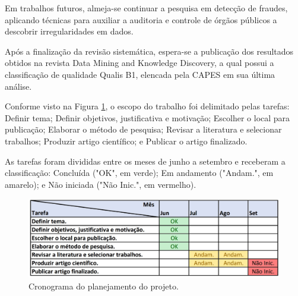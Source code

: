 \documentclass[smallextended]{svjour3}
\begin{document}
Em trabalhos futuros, almeja-se continuar a pesquisa em detecção de fraudes, aplicando técnicas para auxiliar a auditoria e controle de órgãos públicos a descobrir irregularidades em dados.

Após a finalização da revisão sistemática, espera-se a publicação dos resultados obtidos na revista Data Mining and Knowledge Discovery, a qual possui a classificação de qualidade Qualis B1, elencada pela CAPES em sua última análise. 

	
	
	
	\begin{appendices}
			Conforme visto na Figura \ref{fig:cronograma}, o escopo do trabalho foi delimitado pelas tarefas: Definir tema; Definir objetivos, justificativa e motivação; Escolher o local para publicação; Elaborar o método de pesquisa; Revisar a literatura e selecionar trabalhos; Produzir artigo científico; e Publicar o artigo finalizado. 
			
			As tarefas foram divididas entre os meses de junho a setembro e receberam a classificação: Concluída ("OK", em verde); Em andamento ("Andam.", em amarelo); e Não iniciada ("Não Inic.", em vermelho). 
			
			\begin{figure}[!ht]
				\centering
				\includegraphics[width=1\textwidth]{imagens/cronograma2.jpg}
				\caption{Cronograma do planejamento do projeto.}
				\label{fig:cronograma}
			\end{figure}
	\end{appendices}
	
\end{document}
